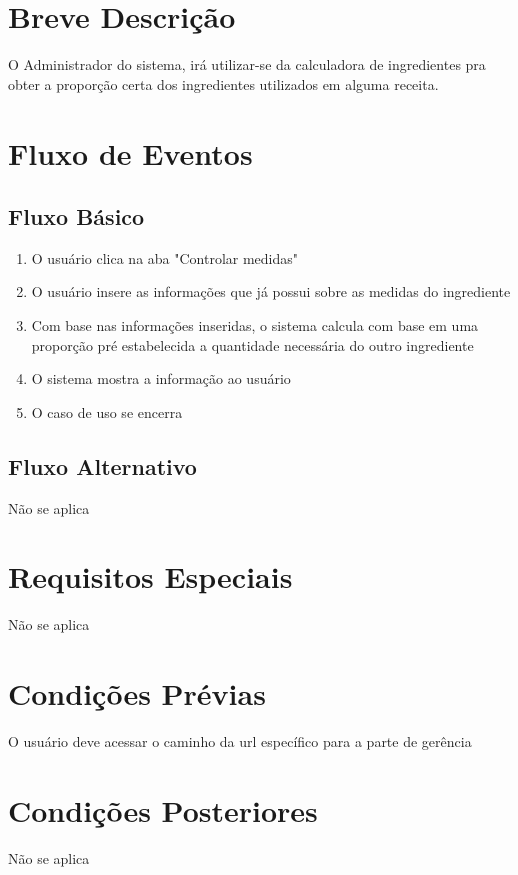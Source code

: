 \section{Breve Descrição}

O Administrador do sistema, irá utilizar-se da calculadora de ingredientes pra obter a proporção certa dos ingredientes utilizados em alguma receita.


\section{Fluxo de Eventos}
\subsection{Fluxo Básico}

\begin{enumerate}
	\item O usuário clica na aba "Controlar medidas"
	\item O usuário insere as informações que já possui sobre as medidas do ingrediente
	\item Com base nas informações inseridas, o sistema calcula com base em uma proporção pré estabelecida a quantidade necessária do outro ingrediente
	\item O sistema mostra a informação ao usuário
	\item O caso de uso se encerra
\end{enumerate}

\subsection{Fluxo Alternativo}

Não se aplica

\section{Requisitos Especiais}

Não se aplica

\section{Condições Prévias}

O usuário deve acessar o caminho da url específico para a parte de gerência

\section{Condições Posteriores}

Não se aplica